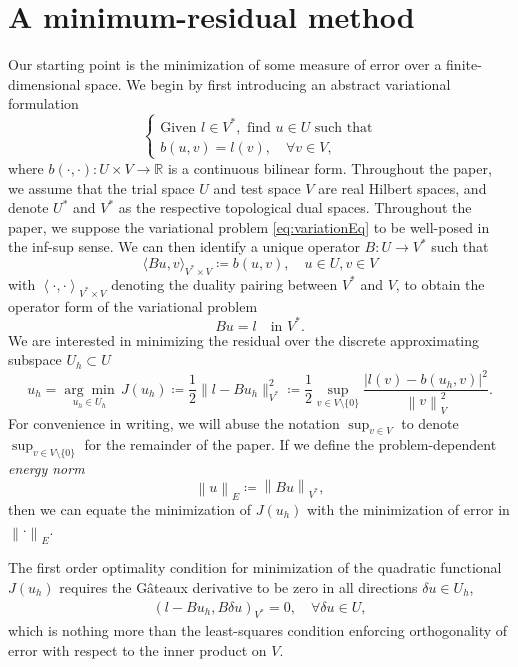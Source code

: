 \documentclass[final,leqno]{siamltex}
\newcommand{\eqnlab}[1]{\label{eq:#1}}
\newcommand{\eqnref}[1]{\eqref{eq:#1}}
\newcommand{\mbb}[1]{\mathbb{#1}}
\newcommand{\nor}[1]{\left\| #1 \right\|}
\newcommand{\LRp}[1]{\left( #1 \right)}
\newcommand{\LRa}[1]{\left\langle #1 \right\rangle}
\begin{document}
\section{A minimum-residual method}

Our starting point is the minimization of some measure of error over a finite-dimensional space.  We begin by first introducing an abstract variational formulation 
\begin{equation}
\eqnlab{variationEq}
\left\{
  \begin{array}{l}
    \text{Given } l \in V^*, \text{ find } u \in U  \text{ such that} \\ 
    b(u,v) = l(v), \quad \forall v\in V,
  \end{array}
  \right.
\end{equation}
where $b\LRp{\cdot,\cdot}: U \times V \to \mbb{R}$ is a continuous bilinear form.  Throughout the paper, we assume that the trial space $U$ and test space $V$ are real Hilbert spaces, and denote $U^*$ and $V^*$ as the respective topological dual spaces.  Throughout the paper, we suppose the variational problem \eqnref{variationEq} to be well-posed in the inf-sup sense. We can then identify a unique operator $B:U\rightarrow V^*$ such that 
\[
\langle Bu,v\rangle_{V^* \times V} \coloneqq b(u,v), \quad u\in U, v\in V
\]
with $\LRa{\cdot, \cdot}_{V^*\times V}$ denoting the duality pairing between $V^*$ and $V$, to obtain the operator form of the variational problem
\begin{equation}
\eqnlab{dualEq}
Bu = l \quad \text{in } V^*.
\end{equation}
We are interested in minimizing the residual over the discrete approximating subspace $U_h \subset U$
\[
u_h = \underset{u_h\in U_h}{\arg\min}\, J(u_h) \coloneqq \frac{1}{2}\|l-Bu_h\|_{V^*}^2 \coloneqq\frac{1}{2} \sup_{v\in V\setminus\{0\}} \frac{| l(v)- b(u_h,v)|^2}{\nor{v}_V^2}.
\]
For convenience in writing, we will abuse the notation $\sup_{v \in V}$ to denote $\sup_{v\in V\setminus\{0\}}$ for the remainder of the paper.  If we define the problem-dependent \textit{energy norm} 
\[
\nor{u}_E \coloneqq \nor{Bu}_{V^*},
\]
then we can equate the minimization of $J(u_h)$ with the minimization of error in $\nor{\cdot}_E$. 

The first order optimality condition for minimization of the quadratic functional $J(u_h)$ requires the G\^ateaux derivative to be zero in all directions $\delta u \in U_h$,
\begin{align}
\left(l-Bu_h,B\delta u\right)_{V^*} = 0, \quad \forall \delta u \in U,
\label{orthog}
\end{align}
which is nothing more than the least-squares condition enforcing orthogonality of error with respect to the inner product on $V$.  
\end{document}
